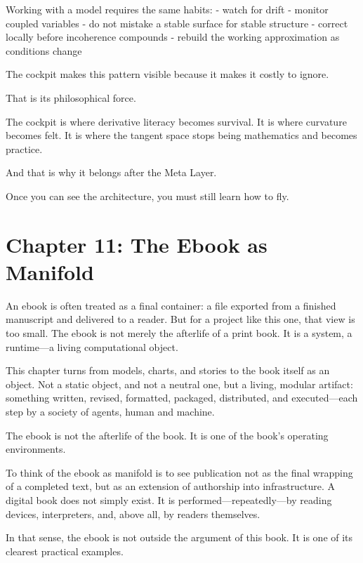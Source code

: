 Working with a model requires the same habits: - watch for drift -
monitor coupled variables - do not mistake a stable surface for stable
structure - correct locally before incoherence compounds - rebuild the
working approximation as conditions change

The cockpit makes this pattern visible because it makes it costly to
ignore.

That is its philosophical force.

The cockpit is where derivative literacy becomes survival. It is where
curvature becomes felt. It is where the tangent space stops being
mathematics and becomes practice.

And that is why it belongs after the Meta Layer.

Once you can see the architecture, you must still learn how to fly.

\newpage
\vspace*{3cm}

\hypertarget{chapter-11-the-ebook-as-manifold}{%
\section{Chapter 11: The Ebook as
Manifold}\label{chapter-11-the-ebook-as-manifold}}

An ebook is often treated as a final container: a file exported from a
finished manuscript and delivered to a reader. But for a project like
this one, that view is too small. The ebook is not merely the afterlife
of a print book. It is a system, a runtime---a living computational
object.

This chapter turns from models, charts, and stories to the book itself
as an object. Not a static object, and not a neutral one, but a living,
modular artifact: something written, revised, formatted, packaged,
distributed, and executed---each step by a society of agents, human and
machine.

The ebook is not the afterlife of the book. It is one of the book's
operating environments.

To think of the ebook as manifold is to see publication not as the final
wrapping of a completed text, but as an extension of authorship into
infrastructure. A digital book does not simply exist. It is
performed---repeatedly---by reading devices, interpreters, and, above
all, by readers themselves.

In that sense, the ebook is not outside the argument of this book. It is
one of its clearest practical examples.

